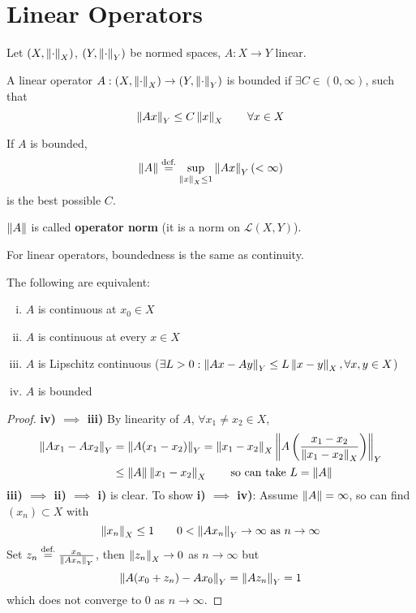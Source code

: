 \documentclass{article}
\begin{document}
\section{Linear Operators}  
Let $(X, \left\|{\cdot}\right\|_X)$, $(Y, \left\|{\cdot}\right\|_Y)$ be normed spaces, $A: X \to Y$ linear.  

\begin{definition}\nl
\label{bounded operator def}
    A linear operator $A: (X, \left\|{\cdot}\right\|_X) \to (Y, \left\|{\cdot}\right\|_Y)$ is bounded if $\exists C \in (0, \infty)$, such that  
    $$
    \left\|{Ax}\right\|_Y \leq C \left\|{x}\right\|_X \qquad \forall x \in X
    $$
\end{definition}

If $A$ is bounded, 
$$
\left\|{A}\right\| \stackrel{\text{def.}}{=} \sup_{\left\|{x}\right\|_X\leq 1} \left\|{Ax}\right\|_Y (<\infty)
$$
is the best possible $C$.  

$\left\|{A}\right\|$ is called \textbf{operator norm} (it is a norm on $\mathcal{L}(X,Y)$).  

For linear operators, boundedness is the same as continuity.  

\begin{theorem}
\label{equivalent defn of bounded operators}
    The following are equivalent:  
    \begin{enumerate}[i)]
        \item $A$ is continuous at $x_0\in X$
        \item $A$ is continuous at every $x \in X$
        \item $A$ is Lipschitz continuous ($\exists L > 0: \left\|{Ax-Ay}\right\|_Y \leq L \left\|{x-y}\right\|_X, \forall x,y\in X$)
        \item $A$ is bounded
    \end{enumerate}
\end{theorem}
\begin{proof}
    \textbf{iv) $\implies$ iii)}\nl
    By linearity of $A$, $\forall x_1\neq x_2 \in X$,  
    \begin{align*}
        \norm{Ax_1 - Ax_2}_Y &= \norm{A(x_1-x_2)}_Y = \norm{x_1-x_2}_X \norm{A \left(\frac{x_1-x_2}{\norm{x_1-x_2}_X}\right)}_Y \\
        &\leq \norm{A} \norm{x_1-x_2}_X \qquad \text{so\ can\ take\ } L = \norm{A}
    \end{align*}
    \textbf{iii) $\implies$ ii) $\implies$ i)} is clear.  
    To show \textbf{i) $\implies$ iv)}:\nl
    Assume $\left\|{A}\right\|=\infty$, so can find $(x_n) \subset X$ with  
    $$
    \left\|{x_n}\right\|_X \leq 1 \qquad 0 < \left\|{Ax_n}\right\|_Y \to \infty \text{\ as\ } n\to \infty
    $$
    Set $z_n \stackrel{\text{def.}}{=} \frac{x_n}{\left\|{Ax_n}\right\|_Y}$,  then $\left\|{z_n}\right\|_X \to 0$ as $n\to \infty$ but 
    $$
    \left\|{A(x_0+z_n)-Ax_0}\right\|_Y = \left\|{Az_n}\right\|_Y = 1
    $$
    which does not converge to $0$ as $n\to \infty$.
\end{proof}
\end{document}
